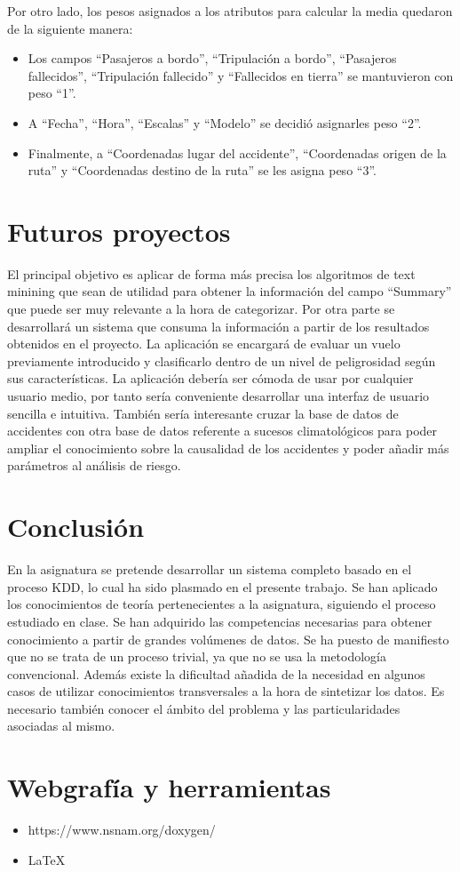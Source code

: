 \documentclass[a4paper,10pt]{article}
\begin{document}
\singlespacing
Por otro lado, los pesos asignados a los atributos para calcular la media quedaron de la siguiente manera:
\begin{itemize}
\item Los campos ``Pasajeros a bordo'', ``Tripulaci\'on a bordo'', ``Pasajeros fallecidos'', ``Tripulaci\'on fallecido'' y ``Fallecidos en tierra'' se mantuvieron con peso ``1''.

\item A ``Fecha'', ``Hora'', ``Escalas'' y ``Modelo'' se decidi\'o asignarles peso ``2''.

\item Finalmente, a ``Coordenadas lugar del accidente'', ``Coordenadas origen de la ruta'' y ``Coordenadas destino de la ruta'' se les asigna peso ``3''.

\end{itemize}
\pagebreak
\section{Futuros proyectos}
El principal objetivo es aplicar de forma m\'as precisa los algoritmos de text minining que sean de utilidad para obtener la informaci\'on del campo ``Summary'' que puede ser muy relevante a la hora de categorizar.
\singlespacing
Por otra parte se desarrollar\'a un sistema que consuma la informaci\'on a partir de los resultados obtenidos en el proyecto. La aplicaci\'on se encargar\'a de evaluar un vuelo previamente introducido y clasificarlo dentro de un nivel de peligrosidad seg\'un sus caracter\'isticas. La aplicaci\'on deber\'ia ser c\'omoda de usar por cualquier usuario medio, por tanto ser\'ia conveniente desarrollar una interfaz de usuario sencilla e intuitiva.
\singlespacing
Tambi\'en ser\'ia interesante cruzar la base de datos de accidentes con otra base de datos referente a sucesos climatol\'ogicos para poder ampliar el conocimiento sobre la causalidad de los accidentes y poder a\~nadir m\'as par\'ametros al an\'alisis de riesgo.

\section{Conclusi\'on}
 En la asignatura se pretende desarrollar un sistema completo basado en el proceso KDD, lo cual ha sido plasmado en el presente trabajo. Se han aplicado los conocimientos de teor\'ia pertenecientes a la asignatura, siguiendo el proceso estudiado en clase. Se han adquirido las competencias necesarias para obtener conocimiento a partir de grandes vol\'umenes de datos.
Se ha puesto de manifiesto que no se trata de un proceso trivial, ya que no se usa la  metodolog\'ia convencional. \singlespacing
Adem\'as existe la dificultad a\~nadida de la necesidad en algunos casos de utilizar conocimientos transversales a la hora de sintetizar los datos. Es necesario tambi\'en conocer el \'ambito del problema y las particularidades asociadas al mismo.

\section{Webgraf\'ia y herramientas}
\begin{itemize}
\item https://www.nsnam.org/doxygen/
\item \LaTeX
\end{itemize}
\end{document}
